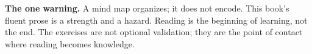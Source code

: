 \textbf{The one warning.} A mind map organizes; it does not encode. This book's fluent prose is a strength and a hazard. Reading is the beginning of learning, not the end. The exercises are not optional validation; they are the point of contact where reading becomes knowledge.

